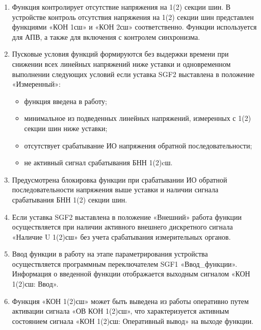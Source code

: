 
\color{black}

\begin{enumerate}

\item
Функция контролирует отсутствие напряжения на 1(2) секции шин. В устройстве контроль отсутствия напряжения на 1(2) секции шин представлен функциями «КОН 1сш» и «КОН 2сш» соответственно. Функции используется для АПВ, а также для включения с контролем синхронизма.

\item
Пусковые условия функций формируются без выдержки времени при снижении всех линейных напряжений ниже уставки и одновременном выполнении следующих условий если уставка SGF2 выставлена в положение «Измеренный»:
\begin{itemize}
    \item функция введена в работу;
    \item минимальное из подведенных линейных напряжений, измеренных с 1(2) секции шин ниже уставки;
    \item отсутствует срабатывание ИО напряжения обратной последовательности;
    \item не активный сигнал срабатывания БНН 1(2)cш.
\end{itemize}

\item
Предусмотрена блокировка функции при срабатывании ИО обратной последовательности напряжения выше уставки и наличии сигнала срабатывания БНН 1(2) секции шин.

\item
Если уставка SGF2 выставлена в положение «Внешний» работа функции осуществляется при наличии активного внешнего дискретного сигнала «Наличие U 1(2)сш» без учета срабатывания измерительных органов.

\item
Ввод функции в работу на этапе параметрирования устройства осуществляется программным переключателем SGF1 «Ввод\_функции». Информация о введенной функции отображается выходным сигналом «КОН 1(2)сш: Ввод».

\item
Функция «КОН 1(2)сш» может быть выведена из работы оперативно путем активации сигнала «ОВ КОН 1(2)сш», что характеризуется активным состоянием сигнала «КОН 1(2)сш: Оперативный вывод» на выходе функции. 


\end{enumerate}

